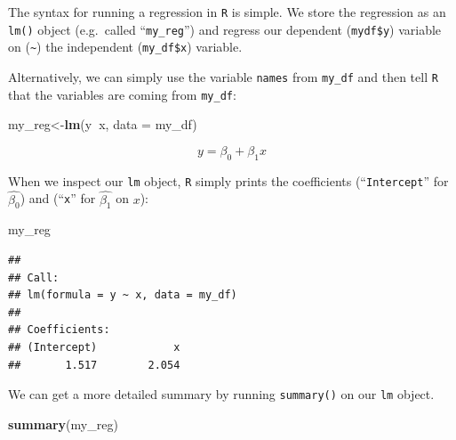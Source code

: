\documentclass[]{book}
\newenvironment{Shaded}{\begin{snugshade}}{\end{snugshade}}
\newcommand{\KeywordTok}[1]{\textcolor[rgb]{0.13,0.29,0.53}{\textbf{#1}}}
\newcommand{\DataTypeTok}[1]{\textcolor[rgb]{0.13,0.29,0.53}{#1}}
\newcommand{\OperatorTok}[1]{\textcolor[rgb]{0.81,0.36,0.00}{\textbf{#1}}}
\newcommand{\NormalTok}[1]{#1}
\theoremstyle{definition}
\theoremstyle{definition}
\theoremstyle{definition}
\theoremstyle{remark}
\begin{document}
The syntax for running a regression in \texttt{R} is simple. We store
the regression as an \texttt{lm()} object (e.g.~called
``\texttt{my\_reg}'') and regress our dependent (\texttt{mydf\$y})
variable on (\texttt{\textasciitilde{}}) the independent
(\texttt{my\_df\$x}) variable.

\begin{Shaded}
\end{Shaded}

Alternatively, we can simply use the variable \texttt{names} from
\texttt{my\_df} and then tell \texttt{R} that the variables are coming
from \texttt{my\_df}:

\begin{Shaded}
\begin{Highlighting}[]
\NormalTok{my_reg<-}\KeywordTok{lm}\NormalTok{(y}\OperatorTok{~}\NormalTok{x, }\DataTypeTok{data =}\NormalTok{ my_df)}
\end{Highlighting}
\end{Shaded}

\[y=\beta_0+\beta_1 x\]

When we inspect our \texttt{lm} object, \texttt{R} simply prints the
coefficients (``\texttt{Intercept}'' for \(\hat{\beta_0}\)) and
(``\texttt{x}'' for \(\hat{\beta_1}\) on \(x\)):

\begin{Shaded}
\begin{Highlighting}[]
\NormalTok{my_reg}
\end{Highlighting}
\end{Shaded}

\begin{verbatim}
## 
## Call:
## lm(formula = y ~ x, data = my_df)
## 
## Coefficients:
## (Intercept)            x  
##       1.517        2.054
\end{verbatim}

We can get a more detailed summary by running \texttt{summary()} on our
\texttt{lm} object.

\begin{Shaded}
\begin{Highlighting}[]
\KeywordTok{summary}\NormalTok{(my_reg)}
\end{Highlighting}
\end{Shaded}
\end{document}

